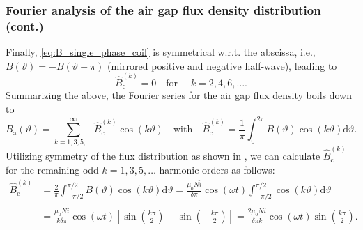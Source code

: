 \begin{frame}
	\frametitle{Fourier analysis of the air gap flux density distribution (cont.)}
        Finally, \eqref{eq:B_single_phase_coil} is symmetrical w.r.t. the abscissa, i.e., $B(\vartheta)=-B(\vartheta+\pi)$ (mirrored positive and negative half-wave), leading to
        $$\hat{B}_{\mathrm{c}}^{(k)} = 0 \quad \mbox{for } \quad k=2,4,6,\ldots .$$
        Summarizing the above, the Fourier series for the air gap flux density boils down to
        \begin{equation}
            B_\mathrm{a}(\vartheta) = \sum_{k=1,3,5,\ldots}^{\infty} \hat{B}_{\mathrm{c}}^{(k)} \cos(k \vartheta) \quad \mbox{with} \quad \hat{B}_{\mathrm{c}}^{(k)} = \frac{1}{\pi} \int_{0}^{2 \pi} B(\vartheta) \cos(k \vartheta) \mathrm{d}\vartheta.
            \label{eq:fourier_series_B_single_phase_coil_reduced}
        \end{equation}
        Utilizing symmetry of the flux distribution as shown in , we can calculate $\hat{B}_{\mathrm{c}}^{(k)}$ for the remaining odd $k=1,3,5,\ldots$ harmonic orders as follows:
        \begin{equation}
            \begin{split}
                \hat{B}_{\mathrm{c}}^{(k)} &= \frac{2}{\pi} \int_{-\pi/2}^{\pi/2} B(\vartheta) \cos(k \vartheta) \mathrm{d}\vartheta = \frac{\mu_0 N \hat{i}}{\delta \pi } \cos(\omega t) \int_{-\pi/2}^{\pi/2} \cos(k \vartheta) \mathrm{d}\vartheta \\ &= \frac{\mu_0 N \hat{i}}{k \delta \pi } \cos(\omega t) \left[ \sin(\frac{k \pi}{2}) - \sin(-\frac{k \pi}{2}) \right] = \frac{2 \mu_0 N \hat{i}}{\delta \pi k} \cos(\omega t) \sin(\frac{k \pi}{2}).
            \end{split}
            \label{eq:B_single_phase_coil_fourier_series_coefficients}
        \end{equation}
\end{frame}

